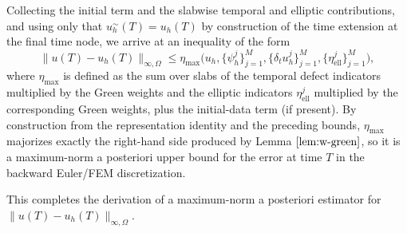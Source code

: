 \documentclass{article}
\begin{document}
Collecting the initial term and the slabwise temporal and elliptic contributions, and using only that \(u_h^\sim(T)=u_h(T)\) by construction of the time extension at the final time node, we arrive at an inequality of the form
\[
\|u(T)-u_h(T)\|_{\infty,\Omega}\le \eta_{\max}\big(u_h,\{\psi_h^j\}_{j=1}^M,\{\delta_t u_h^j\}_{j=1}^M,\{\eta_\mathrm{ell}^j\}_{j=1}^M\big),
\]
where \(\eta_{\max}\) is defined as the sum over slabs of the temporal defect indicators multiplied by the Green weights and the elliptic indicators \(\eta_\mathrm{ell}^j\) multiplied by the corresponding Green weights, plus the initial-data term (if present). By construction from the representation identity and the preceding bounds, \(\eta_{\max}\) majorizes exactly the right-hand side produced by Lemma \(\ref{lem:w-green}\), so it is a maximum-norm a posteriori upper bound for the error at time \(T\) in the backward Euler/FEM discretization.

This completes the derivation of a maximum-norm a posteriori estimator for \(\|u(T)-u_h(T)\|_{\infty,\Omega}\).
\end{document}
